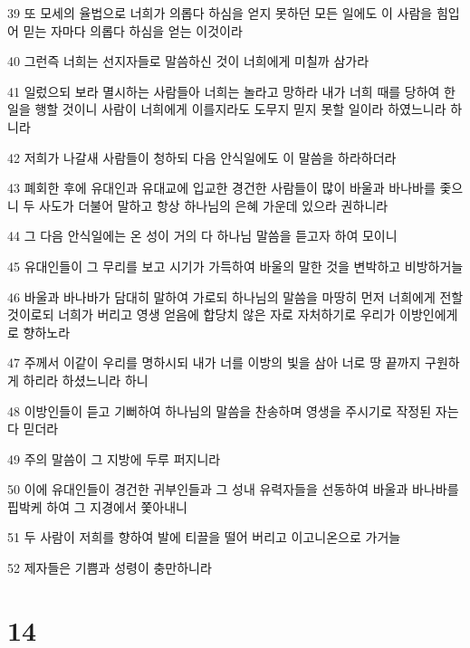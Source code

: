 \par 39 또 모세의 율법으로 너희가 의롭다 하심을 얻지 못하던 모든 일에도 이 사람을 힘입어 믿는 자마다 의롭다 하심을 얻는 이것이라
\par 40 그런즉 너희는 선지자들로 말씀하신 것이 너희에게 미칠까 삼가라
\par 41 일렀으되 보라 멸시하는 사람들아 너희는 놀라고 망하라 내가 너희 때를 당하여 한 일을 행할 것이니 사람이 너희에게 이를지라도 도무지 믿지 못할 일이라 하였느니라 하니라
\par 42 저희가 나갈새 사람들이 청하되 다음 안식일에도 이 말씀을 하라하더라
\par 43 폐회한 후에 유대인과 유대교에 입교한 경건한 사람들이 많이 바울과 바나바를 좇으니 두 사도가 더불어 말하고 항상 하나님의 은혜 가운데 있으라 권하니라
\par 44 그 다음 안식일에는 온 성이 거의 다 하나님 말씀을 듣고자 하여 모이니
\par 45 유대인들이 그 무리를 보고 시기가 가득하여 바울의 말한 것을 변박하고 비방하거늘
\par 46 바울과 바나바가 담대히 말하여 가로되 하나님의 말씀을 마땅히 먼저 너희에게 전할 것이로되 너희가 버리고 영생 얻음에 합당치 않은 자로 자처하기로 우리가 이방인에게로 향하노라
\par 47 주께서 이같이 우리를 명하시되 내가 너를 이방의 빛을 삼아 너로 땅 끝까지 구원하게 하리라 하셨느니라 하니
\par 48 이방인들이 듣고 기뻐하여 하나님의 말씀을 찬송하며 영생을 주시기로 작정된 자는 다 믿더라
\par 49 주의 말씀이 그 지방에 두루 퍼지니라
\par 50 이에 유대인들이 경건한 귀부인들과 그 성내 유력자들을 선동하여 바울과 바나바를 핍박케 하여 그 지경에서 쫓아내니
\par 51 두 사람이 저희를 향하여 발에 티끌을 떨어 버리고 이고니온으로 가거늘
\par 52 제자들은 기쁨과 성령이 충만하니라

\chapter{14}


